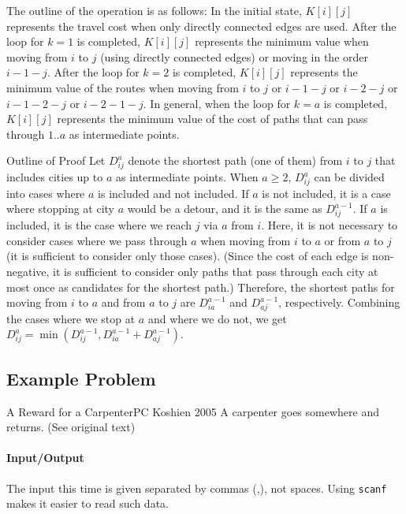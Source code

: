 The outline of the operation is as follows: In the initial state, $K[i][j]$ represents the travel cost when only directly connected edges are used. After the loop for $k=1$ is completed, $K[i][j]$ represents the minimum value when moving from $i$ to $j$ (using directly connected edges) or moving in the order $i-1-j$. After the loop for $k=2$ is completed, $K[i][j]$ represents the minimum value of the routes when moving from $i$ to $j$ or $i-1-j$ or $i-2-j$ or $i-1-2-j$ or $i-2-1-j$. In general, when the loop for $k=a$ is completed, $K[i][j]$ represents the minimum value of the cost of paths that can pass through $1..a$ as intermediate points.

\begin{itembox}[l]{Outline of Proof}
Let $D^a_{ij}$ denote the shortest path (one of them) from $i$ to $j$ that includes cities up to $a$ as intermediate points. When $a\ge 2$, $D^a_{ij}$ can be divided into cases where $a$ is included and not included.
If $a$ is not included, it is a case where stopping at city $a$ would be a detour, and it is the same as $D^{a-1}_{ij}$. If $a$ is included, it is the case where we reach $j$ via $a$ from $i$. Here, it is not necessary to consider cases where we pass through $a$ when moving from $i$ to $a$ or from $a$ to $j$ (it is sufficient to consider only those cases). (Since the cost of each edge is non-negative, it is sufficient to consider only paths that pass through each city at most once as candidates for the shortest path.) Therefore, the shortest paths for moving from $i$ to $a$ and from $a$ to $j$ are $D^{a-1}_{ia}$ and $D^{a-1}_{aj}$, respectively. Combining the cases where we stop at $a$ and where we do not, we get $D^a_{ij}=\min(D^{a-1}_{ij}, D^{a-1}_{ia}+D^{a-1}_{aj})$.
\end{itembox}
\subsection{Example Problem}

\begin{psbox}{A Reward for a Carpenter}{PC Koshien 2005}
A carpenter goes somewhere and returns. (See original text)
  
\end{psbox}

\paragraph{Input/Output}
The input this time is given separated by commas (,), not spaces.
Using \texttt{scanf} makes it easier to read such data.

